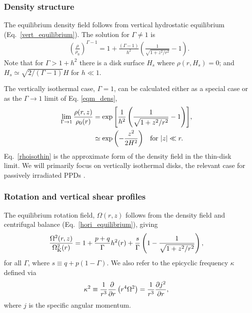 \subsubsection{Density structure}
The equilibrium density field follows from vertical hydrostatic equilibrium (Eq.\ \ref{vert_equilibrium}).
The solution for $\Gamma\neq1$ is
\begin{align}\label{eqm_dens}
  &\left(\frac{\rho}{\rho_0}\right)^{\Gamma-1} = 1 +
  \frac{\left(\Gamma-1\right)}{ h^2}\left(\frac{1}{\sqrt{1+z^2/r^2}}-1\right).
\end{align}
Note that for $\Gamma > 1 +  h^2$ there is a disk surface $H_s$
where $\rho(r,H_s)=0$; and $H_s \simeq \sqrt{2/(\Gamma-1)}H$ for $h\ll 1$.

The vertically isothermal case, $\Gamma = 1$, can be calculated either 
as a special case or as the $\Gamma \rightarrow 1$ limit of Eq. \ref{eqm_dens},    
\begin{subequations}\begin{align}
\lim_{\Gamma\to1}  \frac{\rho(r,z)}{\rho_0(r)} &=
  \exp{\left[\frac{1}{ h^2}\left(\frac{1}{\sqrt{1+z^2/r^2}}-1\right)\right]},   \\
  & \simeq \exp {\left( - {z^2 \over 2 H^2}\right)} \quad\text{for } |z|\ll r \label{rhoisothin}. 
  \end{align}\end{subequations}
Eq.\ \ref{rhoisothin} is the approximate form of the density field in the thin-disk limit.  
We will primarily focus on 
vertically isothermal disks, the relevant case for passively irradiated
PPDs \citep{chiang97}. 

 
 \subsubsection{Rotation and vertical shear profiles}\label{vshear_def}
The equilibrium rotation field, $\Omega(r,z)$ follows from the density field and centrifugal balance (Eq.\ \ref{hori_equilibrium}),
giving 
\begin{align}\label{eqm_rot}
  \frac{\Omega^2(r,z)}{\Omega_{\rm K}^2(r)}=1 +
  \frac{p+q}{\Gamma} h^2(r) 
  +\frac{s}{\Gamma} \left(1-\frac{1}{\sqrt{1+z^2/r^2}}\right), 
\end{align}
for all $\Gamma$, where $s\equiv q+p(1-\Gamma)$.  We also refer to the
epicyclic frequency $\kappa$ defined via
\begin{align}\label{kap2_def}
\kappa^2 \equiv \frac{1}{r^3}\frac{\partial}{\partial r}\left(r^4\Omega^2\right) = \frac{1}{r^3}\frac{\partial j^2}{\partial r}, 
\end{align}
where $j$ is the specific angular momentum. 

